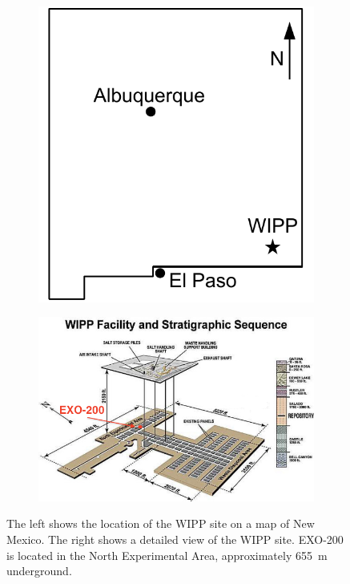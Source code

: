 \documentclass[herrin-thesis.tex]{subfiles}
\begin{document}
\begin{figure}[htbp]
\centering
\begin{subfigure}[c]{0.30\linewidth}
\includegraphics[width=\textwidth]{./figures/detector_wipp_map.pdf}
\end{subfigure}\hspace{0.05\linewidth}\hfill%
\begin{subfigure}[c]{0.60\linewidth}
\includegraphics[width=\textwidth]{./photos/wipp_site_annotated.png}
\end{subfigure}
\caption[The WIPP Site]{The left shows the location of the WIPP site on a map of New Mexico. The right shows a detailed view of the WIPP site. EXO-200 is located in the North Experimental Area, approximately \SI{655}{\m} underground.}
\label{fig:detector_wipp}
\end{figure}
\end{document}
